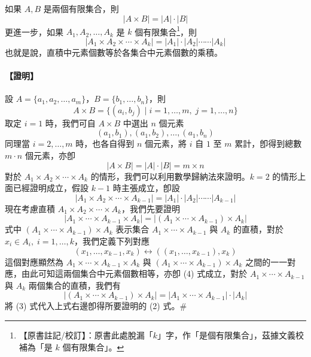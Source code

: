 \medskip
\begin{theorem*}[基本計數原則]
如果 $A, B$ 是兩個有限集合，則
\begin{equation}
|A \times B| = |A| \cdot |B| \tag{1}
\end{equation}
更進一步，如果 $A_1, A_2, \ldots, A_k$ 是 $k$ 個有限集合\label{note:b5s-ch2-p58-k}\footnote{【原書註記/校訂】：原書此處脫漏「$k$」字，作「是個有限集合」，茲據文義校補為「是 $k$ 個有限集合」。}，則
\begin{equation}
|A_1 \times A_2 \times \cdots \times A_k| = |A_1| \cdot |A_2| \cdots\cdots |A_k| \tag{2}
\end{equation}
也就是說，直積中元素個數等於各集合中元素個數的乘積。
\end{theorem*}
\paragraph{【證明】}設 $A = \{a_1, a_2, \ldots, a_m\}$，$B = \{b_1, \ldots, b_n\}$，則
\[
A \times B = \{(a_i, b_j) \mid i = 1, \ldots, m,\; j = 1, \ldots, n\}
\]
取定 $i = 1$ 時，我們可自 $A \times B$ 中選出 $n$ 個元素
\[
(a_1, b_1), (a_1, b_2), \ldots, (a_1, b_n)
\]
同理當 $i = 2, \ldots, m$ 時，也各自得到 $n$ 個元素，將 $i$ 自 $1$ 至 $m$ 累計，卽得到總數 $m \cdot n$ 個元素，亦卽
\[
|A \times B| = |A| \cdot |B| = m \times n
\]
對於 $A_1 \times A_2 \times \cdots \times A_k$ 的情形，我們可以利用數學歸納法來證明。$k = 2$ 的情形上面已經證明成立，假設 $k - 1$ 時主張成立，卽設
\begin{equation}
|A_1 \times A_2 \times \cdots \times A_{k-1}| = |A_1| \cdot |A_2| \cdots\cdots |A_{k-1}| \tag{3}
\end{equation}
現在考慮直積 $A_1 \times A_2 \times \cdots \times A_k$，我們先要證明
\begin{equation}
|A_1 \times \cdots \times A_{k-1} \times A_k| = |(A_1 \times \cdots \times A_{k-1}) \times A_k| \tag{4}
\end{equation}
式中 $(A_1 \times \cdots \times A_{k-1}) \times A_k$ 表示集合 $A_1 \times \cdots \times A_{k-1}$ 與 $A_k$ 的直積，對於 $x_i \in A_i,\; i = 1, \ldots, k$，我們定義下列對應
\[
(x_1, \ldots, x_{k-1}, x_k) \longleftrightarrow ((x_1, \ldots, x_{k-1}), x_k)
\]
這個對應顯然為 $A_1 \times \cdots \times A_{k-1} \times A_k$ 與 $(A_1 \times \cdots \times A_{k-1}) \times A_k$ 之間的一一對應，由此可知這兩個集合中元素個數相等，亦卽 (4) 式成立，對於 $A_1 \times \cdots \times A_{k-1}$ 與 $A_k$ 兩個集合的直積，我們有
\[
|(A_1 \times \cdots \times A_{k-1}) \times A_k| = |A_1 \times \cdots \times A_{k-1}| \cdot |A_k|
\]
將 (3) 式代入上式右邊卽得所要證明的 (2) 式。\hfill $\#$


